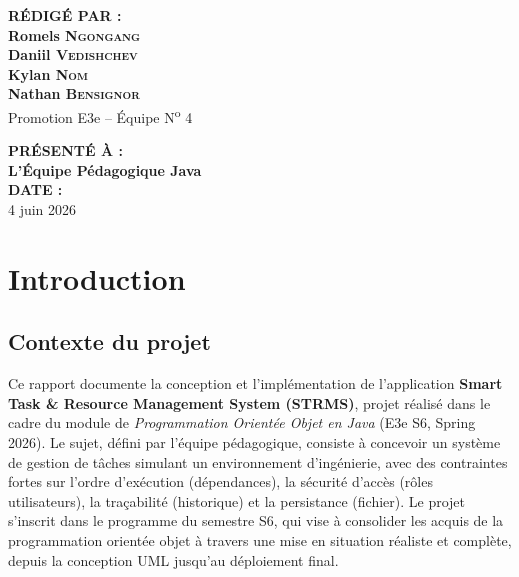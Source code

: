 \documentclass[11pt]{article}
\begin{document}
\begin{titlepage}
\begin{minipage}[t]{0.92\textwidth}
        \begin{minipage}[t]{0.5\textwidth}
            \flushleft
            {\small\bfseries\color{eseoblue} RÉDIGÉ PAR :}\\[0.2cm]
            {\large\bfseries\color{darkgray} Romels \textsc{Ngongang}}\\
            {\large\bfseries\color{darkgray} Daniil \textsc{Vedishchev}}\\
            {\large\bfseries\color{darkgray} Kylan \textsc{Nom}}\\
            {\large\bfseries\color{darkgray} Nathan \textsc{Bensignor}}\\[0.4cm]
            {\small\color{gray} Promotion E3e -- Équipe N\textsuperscript{o} 4}
        \end{minipage}
        \hfill
        \begin{minipage}[t]{0.45\textwidth}
            \flushright
            {\small\bfseries\color{eseoblue} PRÉSENTÉ À :}\\[0.2cm]
            {\large\bfseries\color{darkgray} L'Équipe Pédagogique Java}\\[0.4cm]
            {\small\bfseries\color{eseoblue} DATE :}\\[0.1cm]
            {\large\color{darkgray} 4 juin 2026}
        \end{minipage}
    \end{minipage}
\end{titlepage}

\newpage
\setcounter{page}{1}
\tableofcontents
\newpage

\section{Introduction}

\subsection{Contexte du projet}
Ce rapport documente la conception et l'implémentation de l'application
\textbf{Smart Task \& Resource Management System (STRMS)}, projet réalisé dans
le cadre du module de \textit{Programmation Orientée Objet en Java} (E3e S6,
Spring 2026). Le sujet, défini par l'équipe pédagogique, consiste à concevoir
un système de gestion de tâches simulant un environnement d'ingénierie, avec
des contraintes fortes sur l'ordre d'exécution (dépendances), la sécurité
d'accès (rôles utilisateurs), la traçabilité (historique) et la persistance
(fichier). Le projet s'inscrit dans le programme du semestre S6, qui vise à
consolider les acquis de la programmation orientée objet à travers une
mise en situation réaliste et complète, depuis la conception UML jusqu'au
déploiement final.
\end{document}
